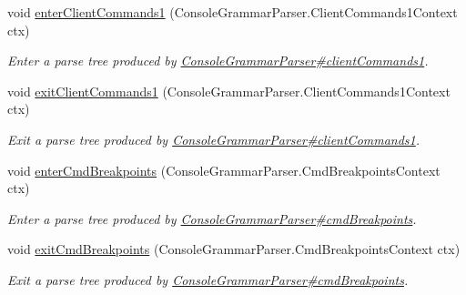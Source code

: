 \begin{DoxyCompactItemize}
void \hyperlink{interfacegov_1_1nasa_1_1jpf_1_1inspector_1_1client_1_1parser_1_1_console_grammar_listener_a47c45e619a472f21d6cdad04027e23d1}{enter\+Client\+Commands1} (Console\+Grammar\+Parser.\+Client\+Commands1\+Context ctx)
\begin{DoxyCompactList}\small\item\em Enter a parse tree produced by \hyperlink{classgov_1_1nasa_1_1jpf_1_1inspector_1_1client_1_1parser_1_1_console_grammar_parser_a0516a8d9423ed5170d4896713513569e}{Console\+Grammar\+Parser\#client\+Commands1}. \end{DoxyCompactList}\item 
void \hyperlink{interfacegov_1_1nasa_1_1jpf_1_1inspector_1_1client_1_1parser_1_1_console_grammar_listener_ac7a41ee8d8b4f7e97aecc528a2eb6a58}{exit\+Client\+Commands1} (Console\+Grammar\+Parser.\+Client\+Commands1\+Context ctx)
\begin{DoxyCompactList}\small\item\em Exit a parse tree produced by \hyperlink{classgov_1_1nasa_1_1jpf_1_1inspector_1_1client_1_1parser_1_1_console_grammar_parser_a0516a8d9423ed5170d4896713513569e}{Console\+Grammar\+Parser\#client\+Commands1}. \end{DoxyCompactList}\item 
void \hyperlink{interfacegov_1_1nasa_1_1jpf_1_1inspector_1_1client_1_1parser_1_1_console_grammar_listener_ab5a9256709242a16d399d88adf3afb2c}{enter\+Cmd\+Breakpoints} (Console\+Grammar\+Parser.\+Cmd\+Breakpoints\+Context ctx)
\begin{DoxyCompactList}\small\item\em Enter a parse tree produced by \hyperlink{classgov_1_1nasa_1_1jpf_1_1inspector_1_1client_1_1parser_1_1_console_grammar_parser_a05e7399334460971133b1effabd14883}{Console\+Grammar\+Parser\#cmd\+Breakpoints}. \end{DoxyCompactList}\item 
void \hyperlink{interfacegov_1_1nasa_1_1jpf_1_1inspector_1_1client_1_1parser_1_1_console_grammar_listener_a022a166ecb5c7680def3a30146b5154b}{exit\+Cmd\+Breakpoints} (Console\+Grammar\+Parser.\+Cmd\+Breakpoints\+Context ctx)
\begin{DoxyCompactList}\small\item\em Exit a parse tree produced by \hyperlink{classgov_1_1nasa_1_1jpf_1_1inspector_1_1client_1_1parser_1_1_console_grammar_parser_a05e7399334460971133b1effabd14883}{Console\+Grammar\+Parser\#cmd\+Breakpoints}. \end{DoxyCompactList}\item 

\end{DoxyCompactItemize}
